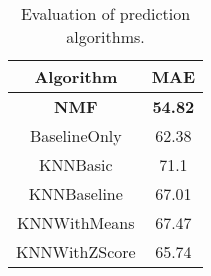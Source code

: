 \begin{table}
  \caption{Evaluation of prediction algorithms.}
  \centering
  \begin{tabular}{cc}
  \toprule
  Algorithm & MAE \\
  \midrule
     \textbf{ NMF } & \textbf{ 54.82 } \\
     BaselineOnly & 62.38 \\
     KNNBasic & 71.1 \\
     KNNBaseline & 67.01 \\
     KNNWithMeans & 67.47 \\
     KNNWithZScore & 65.74 \\
  \end{tabular}
  \label{tab:reco-algo-eval}
\end{table}